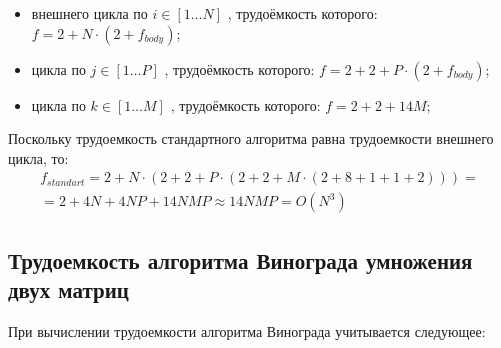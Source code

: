 \begin{itemize}[label=---]
	\item внешнего цикла по $i \in [1 \ldots N]$ , трудоёмкость которого: $f = 2 + N \cdot (2 + f_{body})$;
	\item цикла по $j \in [1 \ldots P]$ , трудоёмкость которого: $f = 2 + 2 + P \cdot (2 + f_{body})$;
	\item цикла по $k \in [1 \ldots M]$ , трудоёмкость которого: $f = 2 + 2 + 14M$;
\end{itemize}

Поскольку трудоемкость стандартного алгоритма равна трудоемкости внешнего цикла, то:
\begin{equation}
	\label{eq:classic}
	\begin{gathered}
		f_{standart} = 2 + N \cdot (2 + 2 + P \cdot (2 + 2 + M \cdot (2 + 8 + 1 + 1 + 2)))= \\
		= 2 + 4N + 4NP + 14NMP \approx 14NMP = O(N^3)
	\end{gathered}
\end{equation}

\subsection{Трудоемкость алгоритма Винограда умножения двух матриц}

При вычислении трудоемкости алгоритма Винограда учитывается следующее:

